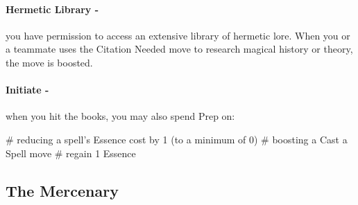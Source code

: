 \paragraph{Hermetic Library -} you have permission to access an extensive library of hermetic lore. When you or a teammate uses the Citation Needed move to research magical history or theory, the move is boosted.

\paragraph{Initiate -} when you hit the books, you may also spend Prep on:
    \begin{easylist}
        # reducing a spell’s Essence cost by 1 (to a minimum of 0)
        # boosting a Cast a Spell move
        # regain 1 Essence
    \end{easylist}


\clearpage
\subsection{The Mercenary}

